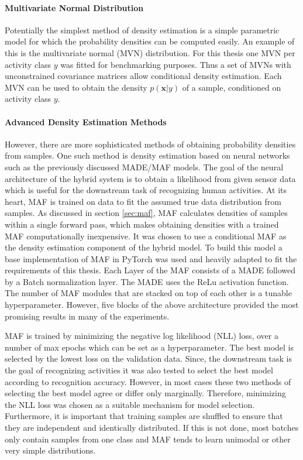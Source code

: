 \documentclass[11pt,titlepage,oneside,openany]{book}
\begin{document}
\paragraph{Multivariate Normal Distribution}
Potentially the simplest method of density estimation is a simple parametric model for which the probability densities can be computed easily. An example of this is the multivariate normal (MVN) distribution. For this thesis one MVN per activity class $y$ was fitted for benchmarking purposes. Thus a set of MVNs with unconstrained covariance matrices allow conditional density estimation. Each MVN can be used to obtain the density $p(\pmb{x}|y)$ of a sample, conditioned on activity class $y$.

\paragraph{Advanced Density Estimation Methods}
However, there are more sophisticated methods of obtaining probability densities from samples. One such method is density estimation based on neural networks such as the previously discussed MADE/MAF models. The goal of the neural architecture of the hybrid system is to obtain a likelihood from given sensor data which is useful for the downstream task of recognizing human activities. At its heart, MAF is trained on data to fit the assumed true data distribution from samples. As discussed in section \ref{sec:maf}, MAF calculates densities of samples within a single forward pass, which makes obtaining densities with a trained MAF computationally inexpensive. It was chosen to use a conditional MAF as the density estimation component of the hybrid model. To build this model a base implementation of MAF in PyTorch \cite{kostrikov_pytorch-flows_2022} was used and heavily adapted to fit the requirements of this thesis. Each Layer of the MAF consists of a MADE followed by a Batch normalization layer. The MADE uses the ReLu activation function. The number of MAF modules that are stacked on top of each other is a tunable hyperparameter. However, five blocks of the above architecture provided the most promising results in many of the experiments.

MAF is trained by minimizing the negative log likelihood (NLL) loss, over a number of max epochs which can be set as a hyperparameter. The best model is selected by the lowest loss on the validation data. Since, the downstream task is the goal of recognizing activities it was also tested to select the best model according to recognition accuracy. However, in most cases these two methods of selecting the best model agree or differ only marginally. Therefore, minimizing the NLL loss was chosen as a suitable mechanism for model selection. Furthermore, it is important that training samples are shuffled to ensure that they are independent and identically distributed. If this is not done, most batches only contain samples from one class and MAF tends to learn unimodal or other very simple distributions.
\end{document}
